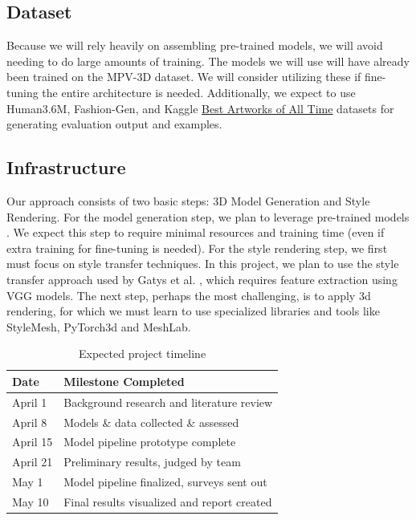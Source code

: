 \documentclass{article}
\begin{document}
\subsection{Dataset}
Because we will rely heavily on assembling pre-trained models, we will avoid needing to do large amounts of training. The models we will use will have already been trained on the MPV-3D dataset\cite{dong2019data1}. We will consider utilizing these if fine-tuning the entire architecture is needed. Additionally, we expect to use Human3.6M\cite{Ionescu2014pose}, Fashion-Gen\cite{rost2018fashiongen}, and Kaggle \href{https://www.kaggle.com/datasets/ikarus777/best-artworks-of-all-time}{Best Artworks of All Time} datasets for generating evaluation output and examples.

\subsection{Infrastructure}
Our approach consists of two basic steps: 3D Model Generation and Style Rendering. For the model generation step, we plan to leverage pre-trained models \cite{m3dvton}. We expect this step to require minimal resources and training time (even if extra training for fine-tuning is needed). For the style rendering step, we first must focus on style transfer techniques. In this project, we plan to use the style transfer approach used by Gatys et al. \cite{gatys2016styleTransfer}, which requires feature extraction using VGG models. The next step, perhaps the most challenging, is to apply 3d rendering, for which we must learn to use specialized libraries and tools like StyleMesh, PyTorch3d and MeshLab. 

\begin{table}[h]
\centering
\begin{tabular}{|l|l|}
\hline
\textbf{Date} & \textbf{Milestone Completed}                \\ \hline
April 1       & Background research and literature review     \\ \hline
April 8       & Models \& data collected \& assessed \\ \hline
April 15      & Model pipeline prototype complete
\\ \hline
April 21      & Preliminary results, judged by team         \\ \hline
May 1         & Model pipeline finalized, surveys sent out  \\ \hline
May 10        & Final results visualized and report created \\ \hline
\end{tabular}
\caption{Expected project timeline}
\end{table}

\newpage


\end{document}
